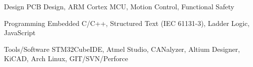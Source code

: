 


\begin{cvskills}

    \cvskill
    {Design} %
    {PCB Design, ARM Cortex MCU, Motion Control, Functional Safety} %

    \cvskill
    {Programming} %
    {Embedded C/C++, Structured Text (IEC 61131-3), Ladder Logic, JavaScript } %



    \cvskill
    {Tools/Software} %
    {STM32CubeIDE, Atmel Studio, CANalyzer, Altium Designer, KiCAD, Arch Linux, GIT/SVN/Perforce} %


\end{cvskills}